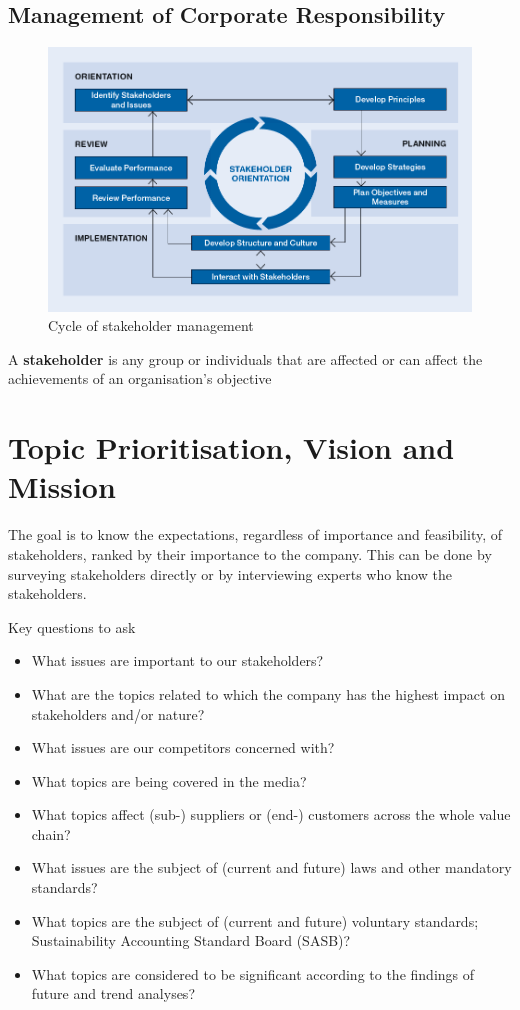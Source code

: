 \documentclass[11pt]{article}
\theoremstyle{definition}
\begin{document}
\subsection{Management of Corporate Responsibility}
\begin{figure}[H]
	\centering
	\includegraphics[width=0.8\linewidth]{img/stakeholder_management}
	\caption{Cycle of stakeholder management}
	\label{fig:stakeholdermanagement}
\end{figure}

\begin{definition}
	A \textbf{stakeholder} is any group or individuals that are affected or can affect the achievements of an
	organisation's objective
\end{definition}

\section{Topic Prioritisation, Vision and Mission}
The goal is to know the expectations, regardless of importance and feasibility, of stakeholders, ranked by their importance to the company. This can be done by surveying stakeholders directly or by interviewing experts who know the stakeholders.

Key questions to ask
\begin{itemize}[label=-]
	\item What issues are important to our stakeholders?
	\item What are the topics related to which the company has the highest impact on stakeholders and/or nature?
	\item What issues are our competitors concerned with?
	\item What topics are being covered in the media?
	\item What topics affect (sub-) suppliers or (end-) customers across the whole value chain?
	\item What issues are the subject of (current and future) laws and other mandatory standards?
	\item What topics are the subject of (current and future) voluntary standards; Sustainability Accounting Standard Board (SASB)?
	\item What topics are considered to be significant according to the findings of future and trend analyses?
\end{itemize}
\end{document}
